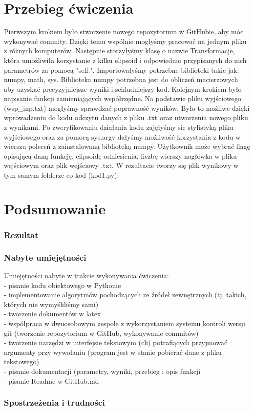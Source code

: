 \documentclass[11pt,a4paper]{article}
\begin{document}
\section {Przebieg ćwiczenia}
Pierwszym krokiem było stworzenie nowego repozytorium w GitHubie, aby móc wykonywać commity. Dzięki temu wspólnie mogłyśmy pracować na jednym pliku z różnych komputerów. Następnie storzyłyśmy klasę o nazwie Transformacje, która umożliwiła korzystanie z kilku elipsoid i odpowiednio przypisanych do nich parametrów za pomocą "self.". Importowałyśmy potrzebne biblioteki takie jak: numpy, math, sys. Biblioteka numpy  potrzebna jest do obliczeń macierzowych aby uzyskać precyzyjniejsze wyniki i schludniejszy kod. Kolejnym krokiem było napisanie funkcji zamieniających współrzędne. Na podstawie pliku wyjściowego (wsp\_inp.txt) mogłyśmy sprawdzać poprawność wyników. Było to możliwe dzięki wprowadzeniu do kodu odczytu danych z pliku .txt oraz utworzenia nowego pliku z wynikami. Po zweryfikowaniu działania kodu zajęłyśmy się stylistyką pliku wyjściowego oraz za pomocą sys.argv dałyśmy możliwość korzystania z kodu w wierszu poleceń z zainstalowaną biblioteką numpy. Użytkownik może wybrać flagę opisującą daną funkcję, elipsoidę odniesienia, liczbę wierszy nagłówka w pliku wejściowym oraz plik wejściowy .txt. W rezultacie tworzy się plik wynikowy w tym samym folderze co kod (kod1.py). 

\section {Podsumowanie}

\subsubsection{Rezultat}
\subsubsection{Nabyte umiejętności}
Umiejętności nabyte w trakcie wykonywania ćwiczenia:\\
 - pisanie kodu obiektowego w Pythonie\\
- implementowanie algorytmów pochodzących ze źródeł zewnętrznych (tj. takich, których nie wymyśliliśmy sami)\\
- tworzenie dokumentów w latex\\
- współpraca w dwuosobowym zespole z wykorzystaniem systemu kontroli wersji git (tworzenie repozytorium w GitHub, wykonywanie commitów)\\
- tworzenie narzędzi w interfejsie tekstowym (cli) potrafiących przyjmować argumenty przy wywołaniu (program jest w stanie pobierać dane z pliku tekstowego)\\
- pisanie dokumentacji (parametry, wyniki, przebieg i opis funkcji\\
- pisanie Readme w GitHub.md\\

\subsubsection{Spostrzeżenia i trudności }
\end{document}
